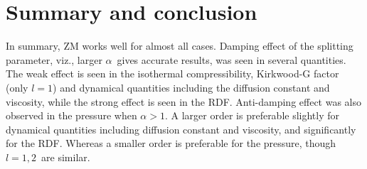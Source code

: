 \documentclass[a4paper,preprint,unsortedaddress,onecolumn,fleqn]{revtex4}
\newcommand{\recheck}[1]{{\color{red} #1}}
\begin{document}





\section{Summary and conclusion}

In summary, ZM works well for almost all cases. Damping effect of the
splitting parameter, viz., larger $\alpha $\ gives accurate results, was
seen in several quantities. The weak effect is seen in the isothermal
compressibility, \recheck{Kirkwood-G factor (only $l=1$)} and dynamical quantities including the diffusion constant
and viscosity, while the strong effect is seen in the RDF. Anti-damping
effect was also observed in the pressure when $\alpha >1$. A larger order is
preferable slightly for dynamical quantities including diffusion constant
and viscosity, and significantly for the RDF. Whereas a smaller order is
preferable for the pressure, though $l=1,2$\ are similar.
\end{document}

